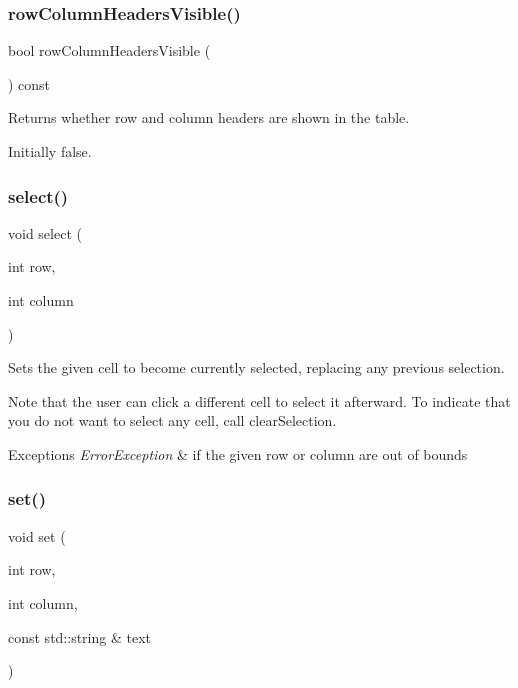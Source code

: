 \subsubsection{\texorpdfstring{row\+Column\+Headers\+Visible()}{rowColumnHeadersVisible()}}
{\footnotesize\ttfamily bool row\+Column\+Headers\+Visible (\begin{DoxyParamCaption}{ }\end{DoxyParamCaption}) const\hspace{0.3cm}{\ttfamily [virtual]}}



Returns whether row and column headers are shown in the table. 

Initially false. \mbox{\label{classGTable_ab06a36d6ed149c8477a1a9d32be2ba43}} 
\subsubsection{\texorpdfstring{select()}{select()}}
{\footnotesize\ttfamily void select (\begin{DoxyParamCaption}\item[{int}]{row,  }\item[{int}]{column }\end{DoxyParamCaption})\hspace{0.3cm}{\ttfamily [virtual]}}



Sets the given cell to become currently selected, replacing any previous selection. 

Note that the user can click a different cell to select it afterward. To indicate that you do not want to select any cell, call clear\+Selection. 
\begin{DoxyExceptions}{Exceptions}
{\em Error\+Exception} & if the given row or column are out of bounds \\
\hline
\end{DoxyExceptions}
\mbox{\label{classGTable_ad1a09eece3a11ef4d2c56a951ae06a69}} 
\subsubsection{\texorpdfstring{set()}{set()}}
{\footnotesize\ttfamily void set (\begin{DoxyParamCaption}\item[{int}]{row,  }\item[{int}]{column,  }\item[{const std\+::string \&}]{text }\end{DoxyParamCaption})\hspace{0.3cm}{\ttfamily [virtual]}}



